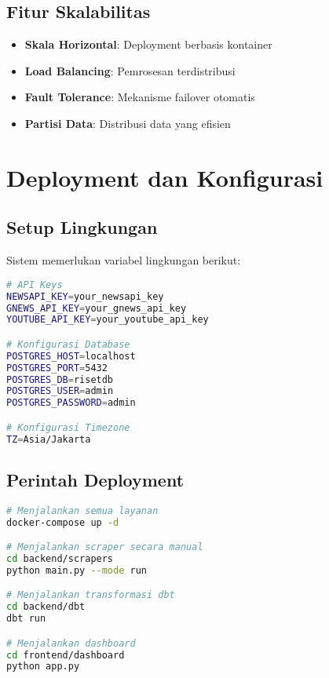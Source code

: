 \documentclass[12pt,a4paper]{article}
\begin{document}
\subsection{Fitur Skalabilitas}
\begin{itemize}
    \item \textbf{Skala Horizontal}: Deployment berbasis kontainer
    \item \textbf{Load Balancing}: Pemrosesan terdistribusi
    \item \textbf{Fault Tolerance}: Mekanisme failover otomatis
    \item \textbf{Partisi Data}: Distribusi data yang efisien
\end{itemize}

\section{Deployment dan Konfigurasi}

\subsection{Setup Lingkungan}
Sistem memerlukan variabel lingkungan berikut:

\begin{lstlisting}[language=bash, caption=Konfigurasi Lingkungan]
# API Keys
NEWSAPI_KEY=your_newsapi_key
GNEWS_API_KEY=your_gnews_api_key
YOUTUBE_API_KEY=your_youtube_api_key

# Konfigurasi Database
POSTGRES_HOST=localhost
POSTGRES_PORT=5432
POSTGRES_DB=risetdb
POSTGRES_USER=admin
POSTGRES_PASSWORD=admin

# Konfigurasi Timezone
TZ=Asia/Jakarta
\end{lstlisting}

\subsection{Perintah Deployment}
\begin{lstlisting}[language=bash, caption=Instruksi Deployment]
# Menjalankan semua layanan
docker-compose up -d

# Menjalankan scraper secara manual
cd backend/scrapers
python main.py --mode run

# Menjalankan transformasi dbt
cd backend/dbt
dbt run

# Menjalankan dashboard
cd frontend/dashboard
python app.py
\end{lstlisting}
\end{document}

